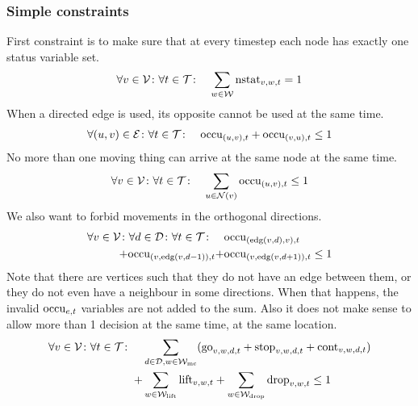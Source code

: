 \subsubsection{Simple constraints}
\label{sec:simple}
First constraint is to make sure that at every timestep each node has exactly
one status variable set.
\begin{align}
    &\forall v \in \mathcal{V} \colon \forall t \in \mathcal{T} \colon & \sum_{w \in \mathcal{W}}
    \mathrm{nstat}_{v,w,t} = 1
\end{align}
When a directed edge is used, its opposite cannot be used at the same time.
\begin{align}
    &\forall (u,v) \in \mathcal{E} \colon \forall t \in \mathcal{T} \colon & \mathrm{occu}_{(u,v),t} +
    \mathrm{occu}_{(v,u),t} \leq 1
\end{align}
No more than one moving thing can arrive at the same node at the same time.
\begin{align}
    &\forall v \in \mathcal{V} \colon \forall t \in \mathcal{T} \colon & \sum_{u \in \mathcal{N}(v)}
    \mathrm{occu}_{(u,v),t} \leq 1
\end{align}
We also want to forbid movements in the orthogonal directions.
\begin{equation}
    \begin{split}
        \forall v \in \mathcal{V} \colon \forall d \in \mathcal{D} \colon \forall t \in \mathcal{T} \colon
        \quad & \mathrm{occu}_{(\mathrm{edg}(v,d),v),t} \\ + \mathrm{occu}_{(v,\mathrm{edg}(v,d-1)),t} + &
        \mathrm{occu}_{(v,\mathrm{edg}(v,d+1)),t} \leq 1
    \end{split}
\end{equation}
Note that there are vertices such that they do not have an edge between them, or
they do not even have a neighbour in some directions. When that happens, the
invalid $\mathrm{occu}_{e,t}$ variables are not added to the sum.
Also it does not make sense to allow more than 1 decision at the same time, at
the same location.
\begin{equation}
    \begin{split}
        \forall v \in \mathcal{V} \colon \forall t \in \mathcal{T} \colon \quad & \sum_{d \in \mathcal{D},
        w \in \mathcal{W}_\mathrm{mc}}(\mathrm{go}_{v,w,d,t} + \mathrm{stop}_{v,w,d,t} + \mathrm{cont}_{v,w,d,t}) \\ + &
        \sum_{w \in \mathcal{W}_\mathrm{lift}} \mathrm{lift}_{v,w,t} + \sum_{w \in \mathcal{W}_\mathrm{drop}} \mathrm{drop}_{v,w,t} \leq 1
    \end{split}
\end{equation}

